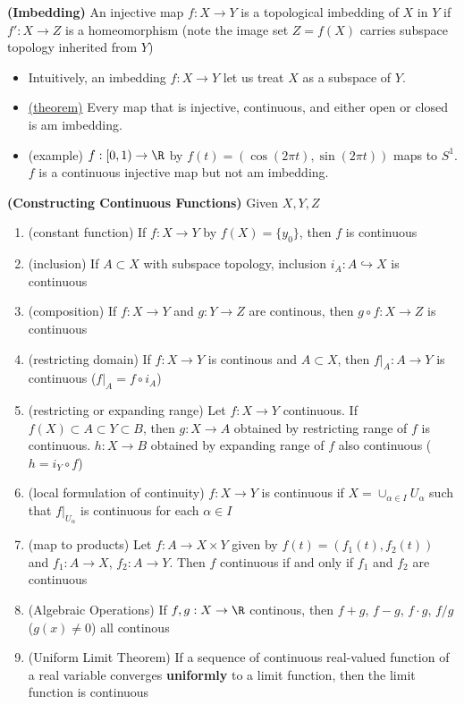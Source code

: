 \documentclass[10.5pt]{article}
\begin{document}
\begin{defn*}
    \textbf{(Imbedding)} An injective map $f:X\to Y$ is a topological imbedding of $X$ in $Y$ if $f':X\to Z$ is a homeomorphism (note the image set $Z = f(X)$ carries subspace topology inherited from $Y$)
    \begin{itemize}
        \item Intuitively, an imbedding $f:X\to Y$ let us treat $X$ as a subspace of $Y$.
        \item \underline{(theorem)} Every map that is injective, continuous, and either open or closed is am imbedding.
        \item (example) $f:[0,1) \to \R$ by $f(t) = (\cos(2\pi t), \sin(2\pi t))$ maps to $S^1$. $f$ is a continuous injective map but not am imbedding.
    \end{itemize}
\end{defn*}


\begin{theorem*}
    \textbf{(Constructing Continuous Functions)} Given $X,Y,Z$
    \begin{enumerate}
        \item (constant function) If $f:X\to Y$ by $f(X) = \{y_0\}$, then $f$ is continuous
        \item (inclusion) If $A\subset X$ with subspace topology, inclusion $i_A:A\hookrightarrow X$ is continuous
        \item (composition) If $f:X\to Y$ and $g:Y\to Z$ are continous, then $g\circ f: X\to Z$ is continuous
        \item (restricting domain) If $f:X\to Y$ is continous and $A\subset X$, then $f|_A : A\to Y$ is continuous ($f|_A = f \circ i_A$)
        \item (restricting or expanding range) Let $f:X\to Y$ continuous. If $f(X)\subset A\subset Y \subset B$, then $g:X\to A$ obtained by restricting range of $f$ is continuous. $h:X\to B$ obtained by expanding range of $f$ also continuous ($h = i_Y \circ f$)
        \item (local formulation of continuity) $f:X\to Y$ is continuous if $X = \cup_{\alpha\in I} U_{\alpha}$ such that $f|_{U_{\alpha}}$ is continuous for each $\alpha \in I$
        \item (map to products) Let $f:A\to X\times Y$ given by $f(t) = (f_1(t), f_2(t))$ and $f_1:A\to X$, $f_2:A\to Y$. Then $f$ continuous if and only if $f_1$ and $f_2$ are continuous
        \item (Algebraic Operations) If $f,g:X\to \R$ continous, then $f+g$, $f-g$, $f \cdot g$, $f/g$ ($g(x) \neq 0$) all continous 
        \item (Uniform Limit Theorem) If a sequence of continuous real-valued function of a real variable converges \textbf{uniformly} to a limit function, then the limit function is continuous 
    \end{enumerate}
\end{theorem*}
\end{document}
